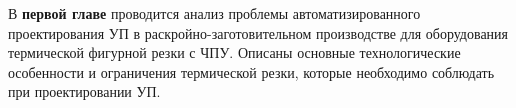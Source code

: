 
В {\bf первой главе} 
проводится анализ проблемы автоматизированного проектирования УП 
в раскройно-заготовительном производстве для оборудования термической фигурной резки с ЧПУ. 
Описаны основные технологические особенности и ограничения термической резки, 
которые необходимо соблюдать при проектировании УП.
